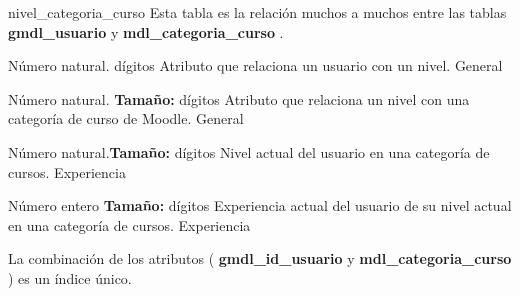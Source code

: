     \begin{Entidad}
        {nivel\_categoria\_curso}
            {Esta tabla es la relación muchos a muchos entre las tablas \textbf{gmdl\_usuario} y \textbf{mdl\_categoria\_curso} .\\}
            
            {Número \newline natural.  dígitos}
            {Atributo que relaciona un usuario con un nivel. }
                {%
                }
            {General}
            
            {Número \newline natural. \newline \textbf{Tamaño:} dígitos}
            {Atributo que relaciona un nivel con una categoría de curso de Moodle.}
                {
                }
            {General}
            
            {Número \newline natural.\newline \textbf{Tamaño:} dígitos}
            {Nivel actual del usuario en una categoría de cursos.}
                {
                }
            {Experiencia}
            
            {Número entero  \newline \textbf{Tamaño:} dígitos }
            {Experiencia actual del usuario de su nivel actual en una categoría de cursos.}
                {
                }
            {Experiencia}
            
    \end{Entidad}

    \noindent La combinación de los atributos ( \textbf{gmdl\_id\_usuario } y \textbf{mdl\_categoria\_curso} ) es un índice único. 
\clearpage    
    
